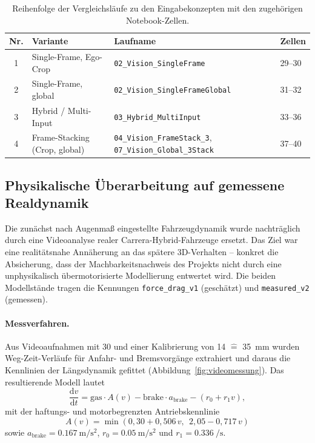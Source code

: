 \begin{table}[htbp]
  \centering
  \caption{Reihenfolge der Vergleichsläufe zu den Eingabekonzepten mit den zugehörigen Notebook-Zellen.}
  \label{tab:testreihenfolge}
  \small
  \begin{tabularx}{\linewidth}{@{}c X l l@{}}
    \toprule
    \textbf{Nr.} & \textbf{Variante} & \textbf{Laufname} & \textbf{Zellen} \\
    \midrule
    1 & Single-Frame, Ego-Crop        & \texttt{02\_Vision\_SingleFrame}       & 29--30 \\
    2 & Single-Frame, global          & \texttt{02\_Vision\_SingleFrameGlobal} & 31--32 \\
    3 & Hybrid / Multi-Input          & \texttt{03\_Hybrid\_MultiInput}        & 33--36 \\
    4 & Frame-Stacking (Crop, global) & \texttt{04\_Vision\_FrameStack\_3}, \texttt{07\_Vision\_Global\_3Stack} & 37--40 \\
    \bottomrule
  \end{tabularx}
\end{table}

\subsection{Physikalische Überarbeitung auf gemessene Realdynamik}
\label{subsec:physik}

Die zunächst nach Augenmaß eingestellte Fahrzeugdynamik wurde nachträglich durch eine Videoanalyse realer Carrera-Hybrid-Fahrzeuge ersetzt. Das Ziel war eine realitätsnahe Annäherung an das spätere 3D-Verhalten -- konkret die Absicherung, dass der Machbarkeitsnachweis des Projekts nicht durch eine unphysikalisch übermotorisierte Modellierung entwertet wird. Die beiden Modellstände tragen die Kennungen \texttt{force\_drag\_v1} (geschätzt) und \texttt{measured\_v2} (gemessen).

\paragraph{Messverfahren.}
Aus Videoaufnahmen mit \SI{30}{\fps} und einer Kalibrierung von \SI{14}{\px} $\hat{=}$ \SI{35}{\milli\meter} wurden Weg-Zeit-Verläufe für Anfahr- und Bremsvorgänge extrahiert und daraus die Kennlinien der Längsdynamik gefittet (Abbildung~\ref{fig:videomessung}). Das resultierende Modell lautet
\begin{equation}
  \frac{\mathrm{d}v}{\mathrm{d}t} = \text{gas} \cdot A(v) - \text{brake} \cdot a_{\text{brake}} - \left( r_0 + r_1 v \right),
  \label{eq:measured_v2}
\end{equation}
mit der haftungs- und motorbegrenzten Antriebskennlinie
\begin{equation}
  A(v) = \min\left( 0{,}30 + 0{,}506\,v,\ \ 2{,}05 - 0{,}717\,v \right)
  \label{eq:antriebskennlinie}
\end{equation}
sowie $a_{\text{brake}} = \SI{0.167}{\meter\per\second\squared}$, $r_0 = \SI{0.05}{\meter\per\second\squared}$ und $r_1 = \SI{0.336}{\per\second}$.

